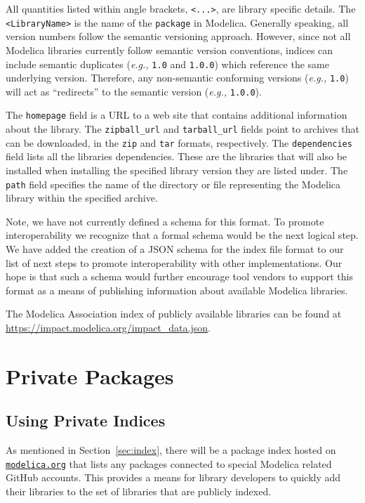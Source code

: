 \documentclass[11pt,a4paper,twocolumn]{article}
\newcommand{\code}[1]{\texttt{#1}} %
\begin{document}
All quantities listed within angle brackets, \code{<...>}, are library
specific details.  The \code{<LibraryName>} is the name of the
\code{package} in Modelica.  Generally speaking, all version numbers
follow the semantic versioning approach.  However, since not all
Modelica libraries currently follow semantic version conventions,
indices can include semantic duplicates (\textit{e.g.,} \code{1.0} and
\code{1.0.0}) which reference the same underlying version.  Therefore,
any non-semantic conforming versions (\textit{e.g.,} \code{1.0}) will
act as ``redirects'' to the semantic version (\textit{e.g.,}
\code{1.0.0}).

The \code{homepage} field is a URL to a web site that contains
additional information about the library.  The \code{zipball\_url} and
\code{tarball\_url} fields point to archives that can be downloaded,
in the \code{zip} and \code{tar} formats, respectively.  The
\code{dependencies} field lists all the libraries dependencies.  These
are the libraries that will also be installed when installing the
specified library version they are listed under.  The \code{path}
field specifies the name of the directory or file representing the
Modelica library within the specified archive.

Note, we have not currently defined a schema for this format.  To
promote interoperability we recognize that a formal schema would be the
next logical step.  We have added the creation of a JSON schema for
the index file format to our list of next steps to promote
interoperability with other implementations.  Our hope is that such a
schema would further encourage tool vendors to support this format as
a means of publishing information about available Modelica libraries.

The Modelica Association index of publicly available libraries can
be found at \url{https://impact.modelica.org/impact\_data.json}.

\section{Private Packages}
\label{sec:private}

\subsection{Using Private Indices}
\label{sec:use_private}

As mentioned in Section~\ref{sec:index}, there will be a package index
hosted on \href{https://modelica.org}{\code{modelica.org}} that lists
any packages connected to special Modelica related GitHub accounts.
This provides a means for library developers to quickly add their
libraries to the set of libraries that are publicly indexed.
\end{document}
